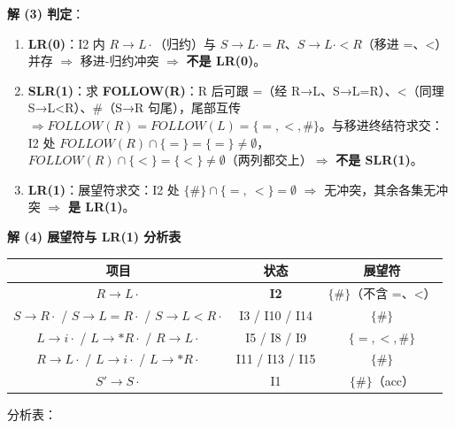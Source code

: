 \documentclass[12pt,a4paper,fontset=windows]{ctexart}
\newcommand{\imp}{\ensuremath{\Rightarrow}}
\begin{document}
\textbf{解 (3) 判定}：
\begin{enumerate}
\item \textbf{LR(0)}：I2 内 $R \to L\cdot$（归约）与 $S \to L\cdot = R$、$S \to L\cdot < R$（移进 =、<）并存 \imp{} 移进-归约冲突 \imp{} \textbf{不是 LR(0)}。
\item \textbf{SLR(1)}：求 \textbf{FOLLOW(R)}：R 后可跟 =（经 R→L、S→L=R）、<（同理 S→L<R）、\#（S→R 句尾），尾部互传 $\Rightarrow FOLLOW(R)=FOLLOW(L)=\{=,<,\#\}$。与移进终结符求交：I2 处 $FOLLOW(R) \cap \{=\} = \{=\} \neq \emptyset$，$FOLLOW(R) \cap \{<\} = \{<\} \neq \emptyset$（两列都交上）\imp{} \textbf{不是 SLR(1)}。
\item \textbf{LR(1)}：展望符求交：I2 处 $\{\#\} \cap \{=,\ <\} = \emptyset$ \imp{} 无冲突，其余各集无冲突 \imp{} \textbf{是 LR(1)}。
\end{enumerate}

\textbf{解 (4) 展望符与 LR(1) 分析表}

\begin{center}
\renewcommand{\arraystretch}{1.25}
\begin{tabular}{c c c}
\toprule
\textbf{项目} & \textbf{状态} & \textbf{展望符} \\
\midrule
$R \to L\cdot$ & \textbf{I2} & $\{\#\}$（不含 =、<） \\
$S \to R\cdot$ / $S \to L=R\cdot$ / $S \to L<R\cdot$ & I3 / I10 / I14 & $\{\#\}$ \\
$L \to i\cdot$ / $L \to *R\cdot$ / $R \to L\cdot$ & I5 / I8 / I9 & $\{=,<,\#\}$ \\
$R \to L\cdot$ / $L \to i\cdot$ / $L \to *R\cdot$ & I11 / I13 / I15 & $\{\#\}$ \\
$S' \to S\cdot$ & I1 & $\{\#\}$（acc） \\
\bottomrule
\end{tabular}
\end{center}

分析表：
\end{document}
